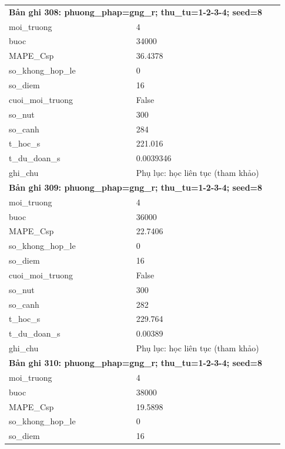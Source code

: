 \begin{longtable}{p{0.43\linewidth}p{0.50\linewidth}}
\midrule
\multicolumn{2}{p{0.95\linewidth}}{\textbf{Bản ghi 308: phuong\_phap=gng\_r; thu\_tu=1-2-3-4; seed=8}} \\
moi\_\allowbreak truong & 4 \\
buoc & 34000 \\
MAPE\_\allowbreak Csp & 36.4378 \\
so\_\allowbreak khong\_\allowbreak hop\_\allowbreak le & 0 \\
so\_\allowbreak diem & 16 \\
cuoi\_\allowbreak moi\_\allowbreak truong & False \\
so\_\allowbreak nut & 300 \\
so\_\allowbreak canh & 284 \\
t\_\allowbreak hoc\_\allowbreak s & 221.016 \\
t\_\allowbreak du\_\allowbreak doan\_\allowbreak s & 0.0039346 \\
ghi\_\allowbreak chu & Phụ lục: học liên tục (tham khảo) \\
\midrule
\multicolumn{2}{p{0.95\linewidth}}{\textbf{Bản ghi 309: phuong\_phap=gng\_r; thu\_tu=1-2-3-4; seed=8}} \\
moi\_\allowbreak truong & 4 \\
buoc & 36000 \\
MAPE\_\allowbreak Csp & 22.7406 \\
so\_\allowbreak khong\_\allowbreak hop\_\allowbreak le & 0 \\
so\_\allowbreak diem & 16 \\
cuoi\_\allowbreak moi\_\allowbreak truong & False \\
so\_\allowbreak nut & 300 \\
so\_\allowbreak canh & 282 \\
t\_\allowbreak hoc\_\allowbreak s & 229.764 \\
t\_\allowbreak du\_\allowbreak doan\_\allowbreak s & 0.00389 \\
ghi\_\allowbreak chu & Phụ lục: học liên tục (tham khảo) \\
\midrule
\multicolumn{2}{p{0.95\linewidth}}{\textbf{Bản ghi 310: phuong\_phap=gng\_r; thu\_tu=1-2-3-4; seed=8}} \\
moi\_\allowbreak truong & 4 \\
buoc & 38000 \\
MAPE\_\allowbreak Csp & 19.5898 \\
so\_\allowbreak khong\_\allowbreak hop\_\allowbreak le & 0 \\
so\_\allowbreak diem & 16 \\

\end{longtable}
